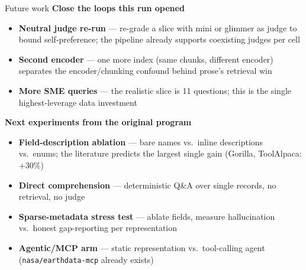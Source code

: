 \documentclass[aspectratio=169,10pt]{beamer}
\begin{document}
\begin{frame}{Future work}
  \textbf{Close the loops this run opened}
  \begin{itemize}
    \item \textbf{Neutral judge re-run} --- re-grade a slice with mini or glimmer as judge to bound
      self-preference; the pipeline already supports coexisting judges per cell
    \item \textbf{Second encoder} --- one more index (same chunks, different encoder) separates the
      encoder/chunking confound behind prose's retrieval win
    \item \textbf{More SME queries} --- the realistic slice is 11 questions; this is the single
      highest-leverage data investment
  \end{itemize}
  \medskip
  \textbf{Next experiments from the original program}
  \begin{itemize}
    \item \textbf{Field-description ablation} --- bare names vs.\ inline descriptions vs.\ enums;
      the literature predicts the largest single gain (Gorilla, ToolAlpaca: $+30\%$)
    \item \textbf{Direct comprehension} --- deterministic Q\&A over single records, no retrieval, no judge
    \item \textbf{Sparse-metadata stress test} --- ablate fields, measure hallucination vs.\
      honest gap-reporting per representation
    \item \textbf{Agentic/MCP arm} --- static representation vs.\ tool-calling agent
      (\texttt{nasa/earthdata-mcp} already exists)
  \end{itemize}
\end{frame}
\end{document}
